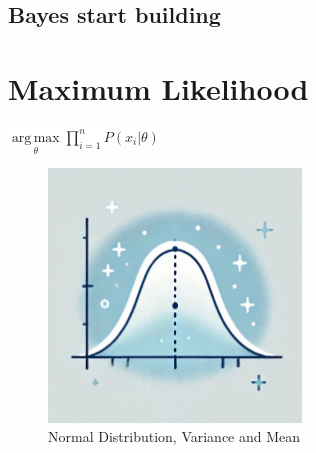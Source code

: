 \documentclass[
  12 pt,
  a4paper,
]{book}
\numberwithin{equation}{section}
\theoremstyle{plain}      %
\theoremstyle{definition} %
\theoremstyle{remark}     %
\theoremstyle{note}         %
\begin{document}
\hypertarget{bayes-start-building}{%
\section{Bayes start building}\label{bayes-start-building}}


\newpage

\hypertarget{maximum-likelihood}{%
\chapter{Maximum Likelihood}\label{maximum-likelihood}}

\begin{center}
\colorbox{white}{\color{navyimpactblue} \huge $\underset{\theta}{\mathop{\mathrm{arg\,max}}} \prod_{i=1}^n P(x_i | \theta)$}
\end{center}

\hfill\break

\begin{figure}[h!]
  \begin{center}
    \includegraphics[width=0.6\textwidth]{pictures/Whimsical-2-normal_distribution.jpeg}
    \caption*{\Large Normal Distribution, Variance and Mean}
  \end{center}
\end{figure}

\newpage

\vspace*{\fill}
\end{document}

